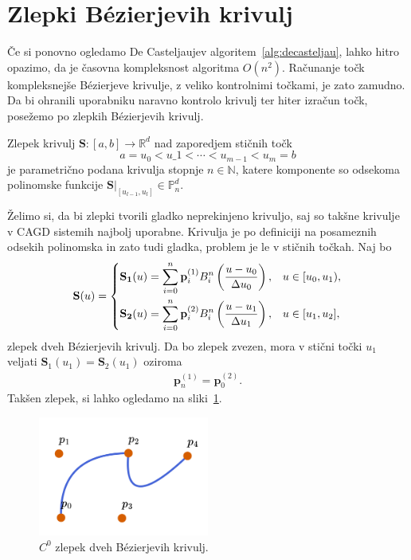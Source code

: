 \documentclass[isrm2, tisk]{fmfdelo}
\newcommand{\R}{\mathbb R}
\newcommand{\N}{\mathbb N}
\newcommand{\Pn}{\mathbb P_n}
\newcommand{\p}{\mathbf{p}}
\begin{document}
    \section{Zlepki Bézierjevih krivulj}
    Če si ponovno ogledamo De Casteljaujev algoritem~\ref{alg:decasteljau}, lahko hitro opazimo, da je časovna kompleksnost algoritma $O(n^2)$.
    Računanje točk kompleksnejše Bézierjeve krivulje, z veliko kontrolnimi točkami,  je zato zamudno.
    Da bi ohranili uporabniku naravno kontrolo krivulj ter hiter izračun točk, posežemo po zlepkih Bézierjevih krivulj.
    \begin{definicija}
        Zlepek krivulj $\mathbf{S}:[a,b]\to \R^d$ nad zaporedjem stičnih točk \[a=u_0 < u\_1 < \cdots < u_{m-1} < u_m = b\] je parametrično podana krivulja stopnje $n\in\N$, katere komponente so odsekoma polinomske funkcije $\mathbf{S}|_{[u_{l-1},u_l]} \in \Pn^d$.
    \end{definicija}
    \noindent Želimo si, da bi zlepki tvorili gladko neprekinjeno krivuljo, saj so takšne krivulje v CAGD sistemih najbolj uporabne.
    Krivulja je po definiciji na posameznih odsekih polinomska in zato tudi gladka, problem je le v stičnih točkah.
    Naj bo
    \[\mathbf{S}(u) = \begin{dcases}
                          \mathbf{S_1}(u) = \sum_{i=0}^n \p_i^{(1)}B_i^n\left(\frac{u-u_0}{\Delta u_0}\right), & u \in [u_0,u_1),  \\
                          \mathbf{S_2}(u) = \sum_{i=0}^n \p_i^{(2)}B_i^n\left(\frac{u-u_1}{\Delta u_1}\right), & u \in [u_1,u_2],
    \end{dcases}\]
    zlepek dveh Bézierjevih krivulj.
    Da bo zlepek zvezen, mora v stični točki $u_1$ veljati $\mathbf{S}_1(u_1) = \mathbf{S}_2(u_1)$ oziroma
    \begin{align}
        \label{c0-zlepek-ref}
        \p_n^{(1)} = \p_0^{(2)}.
    \end{align}
    Takšen zlepek, si lahko ogledamo na sliki~\ref{fig:zlepek-c0}.
    \begin{figure}[h]
        \centering
        \includegraphics[width = 0.50\textwidth]{images/zlepek-c0}
        \caption{$C^0$ zlepek dveh Bézierjevih krivulj.}
        \label{fig:zlepek-c0}
    \end{figure}
\end{document}
